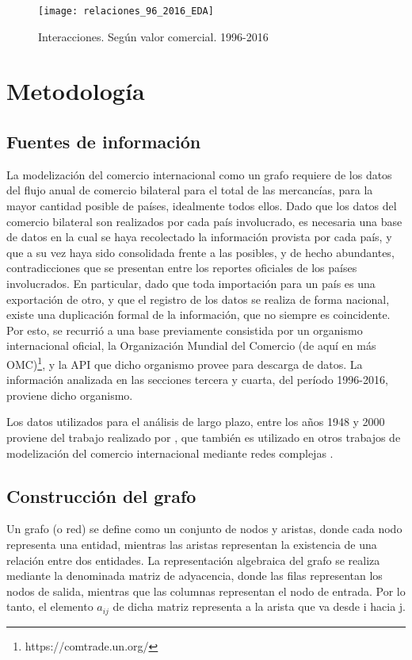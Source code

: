\documentclass[class=article, crop=false]{standalone}
\begin{document}
\begin{figure}
	\centering	
	\texttt{[image: relaciones\_96\_2016\_EDA]}
	\caption{Interacciones. Según valor comercial. 1996-2016}
	\label{fig:hexplot}
\end{figure}


\section{Metodología}

\subsection{Fuentes de información}

La modelización del comercio internacional como un grafo requiere de los datos del flujo anual de comercio bilateral para el total de las mercancías, para la mayor cantidad posible de países, idealmente todos ellos. Dado que los datos del comercio bilateral son realizados por cada país involucrado, es necesaria una base de datos en la cual se haya recolectado la información provista por cada país, y que a su vez haya sido consolidada frente a las posibles, y de hecho abundantes, contradicciones que se presentan entre los reportes oficiales de los países involucrados. En particular, dado que toda importación para un país es una exportación de otro, y que el registro de los datos se realiza de forma nacional, existe una duplicación formal de la información, que no siempre es coincidente. Por esto, se recurrió a una base previamente consistida por un organismo internacional oficial, la Organización Mundial del Comercio (de aquí en más OMC)\footnote{https://comtrade.un.org/}, y la API que dicho organismo provee para descarga de datos. La información analizada  en las secciones tercera y cuarta, del período 1996-2016, proviene dicho organismo.   


Los datos utilizados para el análisis de largo plazo, entre los años 1948 y 2000 proviene del trabajo realizado por \cite{Gleditsch2002}, que también es utilizado en otros trabajos de modelización del comercio internacional mediante redes complejas \cite{Fagiolo2010}.

\subsection{Construcción del grafo}

Un grafo (o red) se define como un conjunto de nodos y aristas, donde cada nodo representa una entidad, mientras las aristas representan la existencia de una relación entre dos entidades. La representación algebraica del grafo se realiza mediante la denominada matriz de adyacencia, donde las filas representan los nodos de salida, mientras que las columnas representan el nodo de entrada. Por lo tanto, el elemento $a_{ij}$ de dicha matriz representa a la arista que va desde i hacia j.
\end{document}
